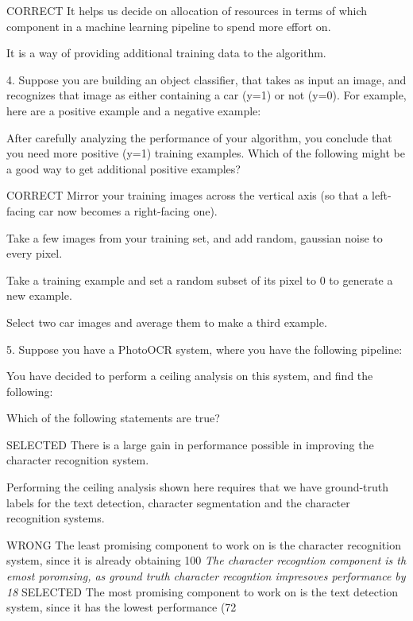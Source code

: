 CORRECT It helps us decide on allocation of resources in terms of which component in a machine learning pipeline to spend more effort on.

It is a way of providing additional training data to the algorithm.

4. 
Suppose you are building an object classifier, that takes as input an image, and recognizes that image as either containing a car (y=1) or not (y=0). For example, here are a positive example and a negative example:


After carefully analyzing the performance of your algorithm, you conclude that you need more positive (y=1) training examples. Which of the following might be a good way to get additional positive examples?


CORRECT Mirror your training images across the vertical axis (so that a left-facing car now becomes a right-facing one).

Take a few images from your training set, and add random, gaussian noise to every pixel.

Take a training example and set a random subset of its pixel to 0 to generate a new example.

Select two car images and average them to make a third example.

5. 
Suppose you have a PhotoOCR system, where you have the following pipeline:


You have decided to perform a ceiling analysis on this system, and find the following:


Which of the following statements are true?


SELECTED There is a large gain in performance possible in improving the character recognition system.

Performing the ceiling analysis shown here requires that we have ground-truth labels for the text detection, character segmentation and the character recognition systems.

WRONG The least promising component to work on is the character recognition system, since it is already obtaining 100%
\textit{The character recogntion component is th emost poromsing, as ground truth character recogntion  impresoves performance by 18%
}
SELECTED The most promising component to work on is the text detection system, since it has the lowest performance (72%




